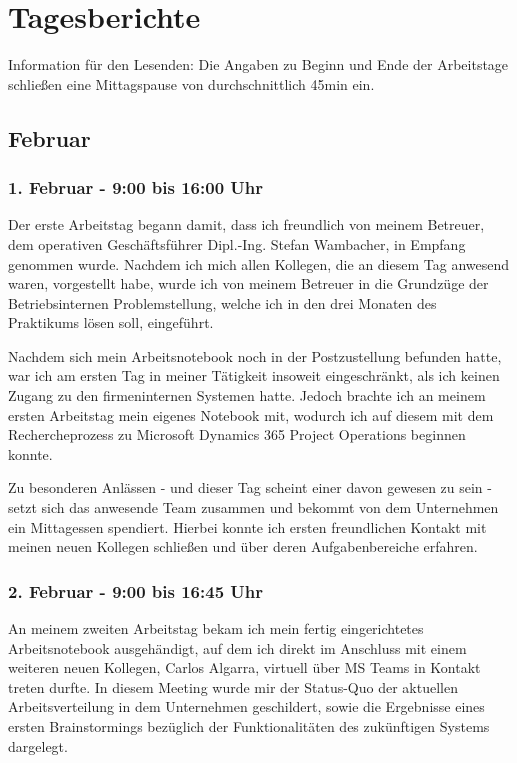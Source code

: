 \section{Tagesberichte}
\label{sec:tagesbericht}

\begin{itshape}
Information für den Lesenden: Die Angaben zu Beginn und Ende der Arbeitstage schließen eine Mittagspause von durchschnittlich 45min ein.
\end{itshape}

\subsection{Februar}
\subsubsection*{1. Februar - 9:00 bis 16:00 Uhr}
Der erste Arbeitstag begann damit, dass ich freundlich von meinem Betreuer, dem operativen Geschäftsführer Dipl.-Ing. Stefan Wambacher, in Empfang genommen wurde. Nachdem ich mich allen Kollegen, die an diesem Tag anwesend waren, vorgestellt habe, wurde ich von meinem Betreuer in die Grundzüge der Betriebsinternen Problemstellung, welche ich in den drei Monaten des Praktikums lösen soll, eingeführt.

Nachdem sich mein Arbeitsnotebook noch in der Postzustellung befunden hatte, war ich am ersten Tag in meiner Tätigkeit insoweit eingeschränkt, als ich keinen Zugang zu den firmeninternen Systemen hatte. Jedoch brachte ich an meinem ersten Arbeitstag mein eigenes Notebook mit, wodurch ich auf diesem mit dem Rechercheprozess zu Microsoft Dynamics 365 Project Operations beginnen konnte.

Zu besonderen Anlässen - und dieser Tag scheint einer davon gewesen zu sein - setzt sich das anwesende Team zusammen und bekommt von dem Unternehmen ein Mittagessen spendiert. Hierbei konnte ich ersten freundlichen Kontakt mit meinen neuen Kollegen schließen und über deren Aufgabenbereiche erfahren.

\subsubsection*{2. Februar - 9:00 bis 16:45 Uhr}
An meinem zweiten Arbeitstag bekam ich mein fertig eingerichtetes Arbeitsnotebook ausgehändigt, auf dem ich direkt im Anschluss mit einem weiteren neuen Kollegen, Carlos Algarra, virtuell über MS Teams in Kontakt treten durfte. In diesem Meeting wurde mir der Status-Quo der aktuellen Arbeitsverteilung in dem Unternehmen geschildert, sowie die Ergebnisse eines ersten Brainstormings bezüglich der Funktionalitäten des zukünftigen Systems dargelegt.

